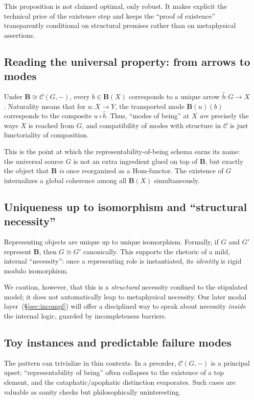 \documentclass[11pt]{article}
\theoremstyle{upright}
\begin{document}
This proposition is not claimed optimal, only robust. It makes explicit the technical price of the existence step and keeps the ``proof of existence'' transparently conditional on structural premises rather than on metaphysical assertions.

\subsection{Reading the universal property: from arrows to modes}
Under \(\mathbf B \cong \mathcal C(G,-)\), every \(b\in \mathbf B(X)\) corresponds to a unique arrow \(\hat b:G\to X\). Naturality means that for \(u:X\to Y\), the transported mode \(\mathbf B(u)(b)\) corresponds to the composite \(u\circ \hat b\). Thus, ``modes of being'' at \(X\) \emph{are} precisely the ways \(X\) is reached from \(G\), and compatibility of modes with structure in \(\mathcal C\) is just functoriality of composition.

This is the point at which the representability-of-being schema earns its name: the universal source \(G\) is not an extra ingredient glued on top of \(\mathbf B\), but exactly the object that \(\mathbf B\) \emph{is} once reorganized as a Hom-functor. The existence of \(G\) internalizes a global coherence among all \(\mathbf B(X)\) simultaneously.

\subsection{Uniqueness up to isomorphism and ``structural necessity''}
Representing objects are unique up to unique isomorphism. Formally, if \(G\) and \(G'\) represent \(\mathbf B\), then \(G\cong G'\) canonically. This supports the rhetoric of a mild, internal ``necessity'': once a representing role is instantiated, its \emph{identity} is rigid modulo isomorphism.

We caution, however, that this is a \emph{structural} necessity confined to the stipulated model; it does not automatically leap to metaphysical necessity. Our later modal layer~(\S\ref{sec:incompl}) will offer a disciplined way to speak about necessity \emph{inside} the internal logic, guarded by incompleteness barriers.

\subsection{Toy instances and predictable failure modes}
The pattern can trivialize in thin contexts. In a preorder, \(\mathcal C(G,-)\) is a principal upset; ``representability of being'' often collapses to the existence of a top element, and the cataphatic/apophatic distinction evaporates. Such cases are valuable as sanity checks but philosophically uninteresting.
\end{document}
